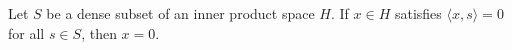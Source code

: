 Let $S$ be a dense subset of an inner product space $H$. If $x \in H$ satisfies $\langle x, s \rangle = 0$ for all $s \in S$, then $x = 0$.
